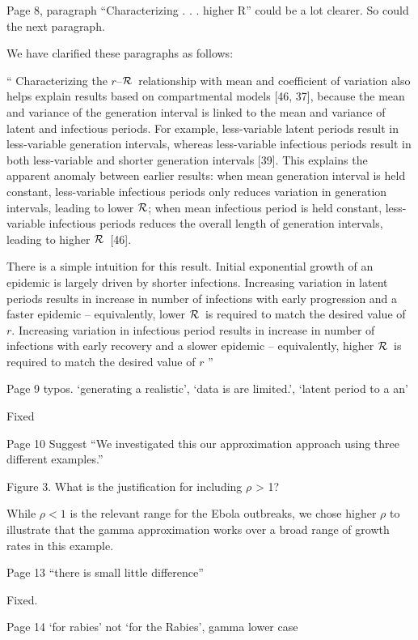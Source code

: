 \documentclass[12pt]{article}
\newcommand{\rR}{\mbox{$r$--$\cal R$}}
\newcommand{\RR}{\ensuremath{{\cal R}}}
\newcommand{\revtext}{\textsf}
\begin{document}
\revtext{Page 8, paragraph “Characterizing . . . higher R” could be a lot clearer. So could the next paragraph.}

We have clarified these paragraphs as follows:

``
Characterizing the \rR\ relationship with mean and coefficient of variation also helps explain results based on compartmental models [46, 37], because the mean and variance of the generation interval is linked to the mean and variance of latent and infectious periods.
For example, less-variable latent periods result in less-variable generation intervals, whereas less-variable infectious periods result in both less-variable and shorter generation intervals [39].
This explains the apparent anomaly between earlier results: 
when mean generation interval is held constant, less-variable infectious periods only reduces variation in generation intervals, leading to lower \RR;
when mean infectious period is held constant, less-variable infectious periods reduces the overall length of generation intervals, leading to higher \RR\ [46].

There is a simple intuition for this result.
Initial exponential growth of an epidemic is largely driven by shorter infections.
Increasing variation in latent periods results in increase in number of infections with early progression and a faster epidemic -- equivalently, lower \RR\ is required to match the desired value of $r$.
Increasing variation in infectious period results in increase in number of infections with early recovery and a slower epidemic -- equivalently, higher \RR\ is required to match the desired value of $r$
''


\revtext{Page 9 typos. ‘generating a realistic’, ‘data is are limited.’, ‘latent period to a an’}

Fixed

\revtext{Page 10 Suggest “We investigated this our approximation approach using three different examples.”}

\revtext{Figure 3. What is the justification for including $\rho$ > 1?}

While $\rho < 1$ is the relevant range for the Ebola outbreaks, we chose higher $\rho$ to illustrate that the gamma approximation works over a broad range of growth rates in this example.

\revtext{Page 13 “there is small little difference”}

Fixed.

\revtext{Page 14 ‘for rabies’ not ‘for the Rabies’, gamma lower case}
\end{document}
